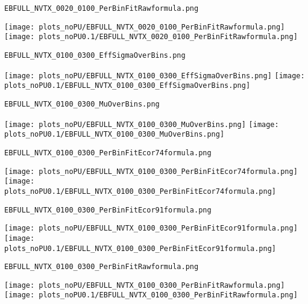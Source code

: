 \begin{frame}[fragile]
\begin{verbatim}
EBFULL_NVTX_0020_0100_PerBinFitRawformula.png
\end{verbatim}
\texttt{[image: plots\_noPU/EBFULL\_NVTX\_0020\_0100\_PerBinFitRawformula.png]}
\texttt{[image: plots\_noPU0.1/EBFULL\_NVTX\_0020\_0100\_PerBinFitRawformula.png]}
\end{frame}
\begin{frame}[fragile]
\begin{verbatim}
EBFULL_NVTX_0100_0300_EffSigmaOverBins.png
\end{verbatim}
\texttt{[image: plots\_noPU/EBFULL\_NVTX\_0100\_0300\_EffSigmaOverBins.png]}
\texttt{[image: plots\_noPU0.1/EBFULL\_NVTX\_0100\_0300\_EffSigmaOverBins.png]}
\end{frame}
\begin{frame}[fragile]
\begin{verbatim}
EBFULL_NVTX_0100_0300_MuOverBins.png
\end{verbatim}
\texttt{[image: plots\_noPU/EBFULL\_NVTX\_0100\_0300\_MuOverBins.png]}
\texttt{[image: plots\_noPU0.1/EBFULL\_NVTX\_0100\_0300\_MuOverBins.png]}
\end{frame}
\begin{frame}[fragile]
\begin{verbatim}
EBFULL_NVTX_0100_0300_PerBinFitEcor74formula.png
\end{verbatim}
\texttt{[image: plots\_noPU/EBFULL\_NVTX\_0100\_0300\_PerBinFitEcor74formula.png]}
\texttt{[image: plots\_noPU0.1/EBFULL\_NVTX\_0100\_0300\_PerBinFitEcor74formula.png]}
\end{frame}
\begin{frame}[fragile]
\begin{verbatim}
EBFULL_NVTX_0100_0300_PerBinFitEcor91formula.png
\end{verbatim}
\texttt{[image: plots\_noPU/EBFULL\_NVTX\_0100\_0300\_PerBinFitEcor91formula.png]}
\texttt{[image: plots\_noPU0.1/EBFULL\_NVTX\_0100\_0300\_PerBinFitEcor91formula.png]}
\end{frame}
\begin{frame}[fragile]
\begin{verbatim}
EBFULL_NVTX_0100_0300_PerBinFitRawformula.png
\end{verbatim}
\texttt{[image: plots\_noPU/EBFULL\_NVTX\_0100\_0300\_PerBinFitRawformula.png]}
\texttt{[image: plots\_noPU0.1/EBFULL\_NVTX\_0100\_0300\_PerBinFitRawformula.png]}
\end{frame}
